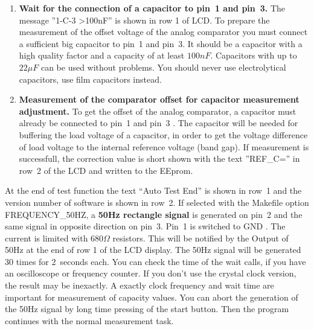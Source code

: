 \begin{enumerate}
\item {\bf Wait for the connection of a capacitor to pin~1 and pin~3.}
The message ''1-C-3 \textgreater 100nF'' is shown in row 1 of LCD.
To prepare the measurement of the offset voltage of the analog comparator you must connect
a sufficient big capacitor to pin~1 and pin~3.
It should be a capacitor with a high quality factor and a capacity of at least  \(100 nF\).
Capacitors with up to \(22 \mu F\) can be used without problems.
You should never use electrolytical capacitors, use film capacitors instead.

\item {\bf Measurement of the comparator offset for capacitor measurement adjustment.}
To get the offset of the analog comparator, a capacitor must already be connected to pin~1 and pin~3 .
The capacitor will be needed for buffering the load voltage of a capacitor, in order to get the voltage
difference of load voltage to the internal reference voltage (band gap).
If measurement is successfull, the correction value is short shown with the text ''REF\_C='' in row~2 of 
the LCD and written to the EEprom.

\end{enumerate}

At the end of test function the text ``Auto Test End''  is shown in row~1 and the version number of software is shown in row~2.
If selected with the Makefile option FREQUENCY\_50HZ, a {\bf 50Hz rectangle signal} is generated on pin~2 and 
the same signal in opposite direction on pin~3.
Pin~1 is switched to GND . The current is limited with \(680\Omega\) resistors.
This will be notified by the Output of 50Hz at the end of row 1 of the LCD display.
The 50Hz signal will be generated 30 times for 2~seconds each.
You can check the time of the wait calls, if you have an oscilloscope or frequency counter.
If you don't use the crystal clock version, the result may be inexactly.
A exactly clock frequency and wait time are important for measurement of capacity values.
You can abort the generation of the 50Hz signal by long time pressing of the start button.
Then the program continues with the normal measurement task.


